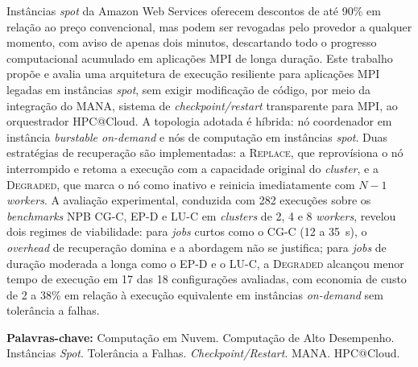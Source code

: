 \begin{resumo}[Resumo]
Instâncias \textit{spot} da Amazon Web Services oferecem descontos de até 90\%
em relação ao preço convencional, mas podem ser revogadas pelo provedor a
qualquer momento, com aviso de apenas dois minutos, descartando todo o progresso
computacional acumulado em aplicações MPI de longa duração. Este trabalho propõe
e avalia uma arquitetura de execução resiliente para aplicações MPI legadas em
instâncias \textit{spot}, sem exigir modificação de código, por meio da
integração do MANA, sistema de \textit{checkpoint/restart} transparente para MPI,
ao orquestrador HPC@Cloud. A topologia adotada é híbrida: nó coordenador em
instância \textit{burstable on-demand} e nós de computação em instâncias
\textit{spot}. Duas estratégias de recuperação são implementadas: a
\textsc{Replace}, que reprovísiona o nó interrompido e retoma a execução com a
capacidade original do \textit{cluster}, e a \textsc{Degraded}, que marca o nó
como inativo e reinicia imediatamente com $N{-}1$ \textit{workers}. A avaliação
experimental, conduzida com 282 execuções sobre os \textit{benchmarks} NPB
CG-C, EP-D e LU-C em \textit{clusters} de 2, 4 e 8 \textit{workers}, revelou
dois regimes de viabilidade: para \textit{jobs} curtos como o CG-C (12 a 35~s),
o \textit{overhead} de recuperação domina e a abordagem não se justifica; para
\textit{jobs} de duração moderada a longa como o EP-D e o LU-C, a
\textsc{Degraded} alcançou menor tempo de execução em 17 das 18 configurações
avaliadas, com economia de custo de 2 a 38\% em relação à execução equivalente
em instâncias \textit{on-demand} sem tolerância a falhas.

\vspace{\baselineskip}
\textbf{Palavras-chave:} Computação em Nuvem. Computação de Alto Desempenho.
Instâncias \textit{Spot}. Tolerância a Falhas. \textit{Checkpoint/Restart}.
MANA. HPC@Cloud.
\end{resumo}


